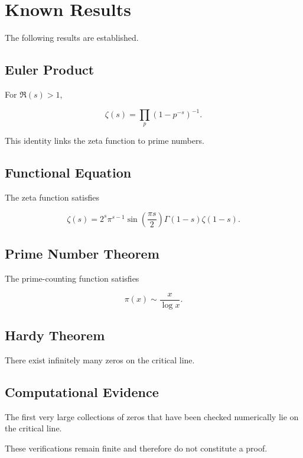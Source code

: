 \section{Known Results}

The following results are established.

\subsection{Euler Product}

For $\Re(s)>1$,

\[
\zeta(s)
=
\prod_{p}
\left(
1-p^{-s}
\right)^{-1}.
\]

This identity links the zeta function to prime numbers.

\subsection{Functional Equation}

The zeta function satisfies

\[
\zeta(s)
=
2^s
\pi^{s-1}
\sin\left(
\frac{\pi s}{2}
\right)
\Gamma(1-s)
\zeta(1-s).
\]

\subsection{Prime Number Theorem}

The prime-counting function satisfies

\[
\pi(x)
\sim
\frac{x}{\log x}.
\]

\subsection{Hardy Theorem}

There exist infinitely many zeros on the critical line.

\subsection{Computational Evidence}

The first very large collections of zeros that have been checked numerically lie on the critical line.

These verifications remain finite and therefore do not constitute a proof.